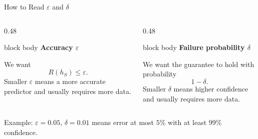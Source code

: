 \documentclass[aspectratio=169,10pt]{beamer}
\newcommand{\eps}{\varepsilon}
\begin{document}
\begin{frame}[t]{How to Read $\eps$ and $\delta$}
  \vspace{0.20cm}
  \begin{columns}[T,totalwidth=\textwidth]
    \begin{column}{0.48\textwidth}
      \begin{beamercolorbox}[rounded=true,sep=0.30cm,wd=\linewidth]{block body}
        \centering
        {\fontsize{18}{22}\selectfont\bfseries Accuracy $\eps$}\par
        \vspace{0.20cm}
        {\normalsize We want
        \[
          R(h_S)\le\eps.
        \]
        Smaller $\eps$ means a more accurate predictor and usually requires more data.}
      \end{beamercolorbox}
    \end{column}
    \begin{column}{0.48\textwidth}
      \begin{beamercolorbox}[rounded=true,sep=0.30cm,wd=\linewidth]{block body}
        \centering
        {\fontsize{18}{22}\selectfont\bfseries Failure probability $\delta$}\par
        \vspace{0.20cm}
        {\normalsize We want the guarantee to hold with probability
        \[
          1-\delta.
        \]
        Smaller $\delta$ means higher confidence and usually requires more data.}
      \end{beamercolorbox}
    \end{column}
  \end{columns}
  \vspace{0.40cm}
  \centering
  {\normalsize Example: $\eps=0.05$, $\delta=0.01$ means error at most $5\%$ with at least $99\%$ confidence.}
\end{frame}
\end{document}
